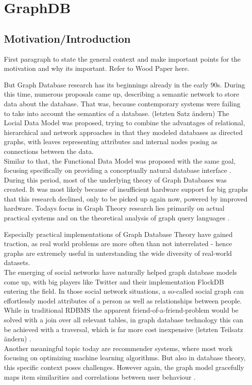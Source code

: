 
\chapter{GraphDB}

\section{Motivation/Introduction}
First paragraph to state the general context and make important points for the motivation and why its important. Refer to Wood Paper here.

But Graph Database research has its beginnings already in the early 90s. During this time, numerous proposals came up, describing a semantic network to store data about the database. That was, because contemporary systems were failing to take into account the semantics of a database. (letzten Satz ändern)
The Locial Data Model \cite{KUPERLDM} was proposed, trying to combine the advantages of relational, hierarchical and network approaches in that they modeled databases as directed graphs, with leaves representing attributes and internal nodes posing as connections between the data. \\
Similar to that, the Functional Data Model \cite{Shipman1979} was proposed with the same goal, focusing specifically on providing a conceptually natural database interface \cite{Angles2018AnIT}. \\
During this period, most of the underlying theory of Graph Databases was created.
It was most likely because of insufficient hardware support for big graphs that this research declined, only to be picked up again now, powered by improved hardware. Todays focus in Graph Theory research lies primarily on actual practical systems and on the theoretical analysis of graph query languages \cite{Angles2018AnIT}.

Especially practical implementations of Graph Database Theory have gained traction, as real world problems are more often than not interrelated - hence graphs are extremely useful in unterstanding the wide diversity of real-world datasets.\cite{Robinson2013} \\
The emerging of social networks have naturally helped graph database models come up, with big players like Twitter and their implementation FlockDB entering the field. In those social network situations, a so-called social graph can effortlessly model attributes of a person as well as relationships between people. While in traditional RDBMS the apparent friend-of-a-friend-problem would be solved with a join over all relevant tables, in graph database technology this can be achieved with a traversal, which is far more cost inexpensive (letzten Teilsatz ändern) \cite{Miller2013GraphDA}. \\
Another meaningful topic today are recommender systems, where most work focusing on optimizing machine learning algorithms. But also in database theory, this specific context poses challenges. However again, the graph model gracefully maps item similarities and correlations between user behaviour \cite{Huang2002}.

